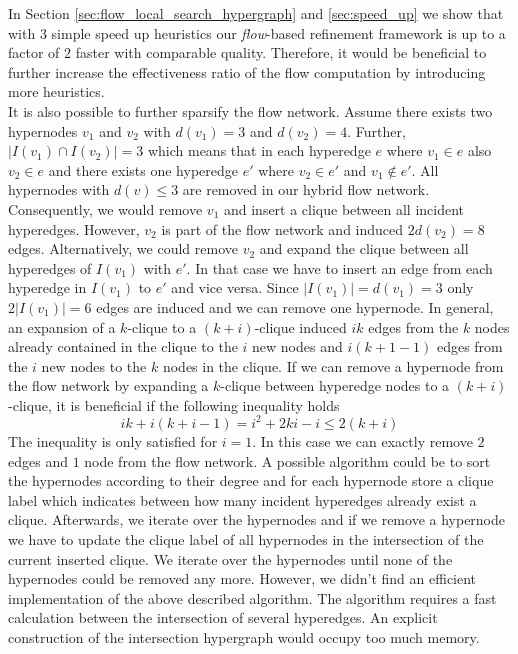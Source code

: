 In Section \ref{sec:flow_local_search_hypergraph} and \ref{sec:speed_up} we show that with
$3$ simple speed up heuristics our \emph{flow}-based refinement framework is up to a factor
of $2$ faster with comparable quality. Therefore, it would be beneficial to further increase
the effectiveness ratio of the flow computation by introducing more heuristics. \\
It is also possible to further sparsify the flow network. Assume there exists two hypernodes
$v_1$ and $v_2$ with $d(v_1) = 3$ and $d(v_2) = 4$. Further, $|I(v_1) \cap I(v_2)| = 3$ which means
that in each hyperedge $e$ where $v_1 \in e$ also $v_2 \in e$ and there exists one hyperedge $e'$
where $v_2 \in e'$ and $v_1 \notin e'$. All hypernodes with $d(v) \le 3$ are removed in our
hybrid flow network. Consequently, we would remove $v_1$ and insert a clique between all incident
hyperedges. However, $v_2$ is part of the flow network and induced $2d(v_2) = 8$ edges.
Alternatively, we could remove $v_2$ and expand the clique between all hyperedges of $I(v_1)$
with $e'$. In that case we have to insert an edge from each hyperedge in $I(v_1)$ to $e'$ and vice
versa. Since $|I(v_1)| = d(v_1) = 3$ only $2|I(v_1)| = 6$ edges are induced and we can remove
one hypernode. In general, an expansion of a $k$-clique to a $(k+i)$-clique induced 
$ik$ edges from the $k$ nodes already contained in the clique to the $i$ new nodes and
$i(k+1-1)$ edges from the $i$ new nodes to the $k$ nodes in the clique. If we can remove a 
hypernode from the flow network by expanding a $k$-clique between hyperedge nodes to a $(k+i)$-clique,
it is beneficial if the following inequality holds 
\[ik + i(k+i-1) = i^2 + 2ki - i \le 2(k+i)\]
The inequality is only satisfied for $i = 1$. In this case we can exactly remove $2$ edges and
$1$ node from the flow network. A possible algorithm could be to sort the hypernodes according
to their degree and for each hypernode store a clique label which indicates between how many
incident hyperedges already exist a clique. Afterwards, we iterate over the hypernodes and if we remove
a hypernode we have to update the clique label of all hypernodes in the intersection of the
current inserted clique. We iterate over the hypernodes until none of the hypernodes could
be removed any more. However, we didn't find an efficient implementation of the above described
algorithm. The algorithm requires a fast calculation between the intersection of several
hyperedges. An explicit construction of the intersection hypergraph would occupy too much
memory. 
